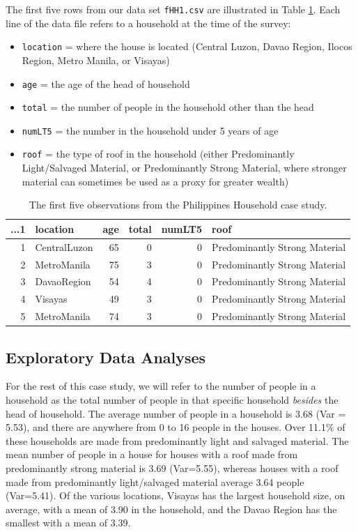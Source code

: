 \documentclass[
]{krantz}
\providecommand{\tightlist}{%
  \setlength{\itemsep}{0pt}\setlength{\parskip}{0pt}}
\begin{document}
The first five rows from our data set \texttt{fHH1.csv} are illustrated in Table \ref{tab:fHH1table1}. Each line of the data file refers to a household at the time of the survey:

\begin{itemize}
\tightlist
\item
  \texttt{location} = where the house is located (Central Luzon, Davao Region, Ilocos Region, Metro Manila, or Visayas)
\item
  \texttt{age} = the age of the head of household
\item
  \texttt{total} = the number of people in the household other than the head
\item
  \texttt{numLT5} = the number in the household under 5 years of age
\item
  \texttt{roof} = the type of roof in the household (either Predominantly Light/Salvaged Material, or Predominantly Strong Material, where stronger material can sometimes be used as a proxy for greater wealth)
\end{itemize}

\begin{table}

\caption{\label{tab:fHH1table1}The first five observations from the Philippines Household case study.}
\centering
\begin{tabular}[t]{rlrrrl}
\toprule
...1 & location & age & total & numLT5 & roof\\
\midrule
1 & CentralLuzon & 65 & 0 & 0 & Predominantly Strong Material\\
2 & MetroManila & 75 & 3 & 0 & Predominantly Strong Material\\
3 & DavaoRegion & 54 & 4 & 0 & Predominantly Strong Material\\
4 & Visayas & 49 & 3 & 0 & Predominantly Strong Material\\
5 & MetroManila & 74 & 3 & 0 & Predominantly Strong Material\\
\bottomrule
\end{tabular}
\end{table}

\subsection{Exploratory Data Analyses}\label{exploreHH}

For the rest of this case study, we will refer to the number of people in a household as the total number of people in that specific household \emph{besides} the head of household. The average number of people in a household is 3.68 (Var = 5.53), and there are anywhere from 0 to 16 people in the houses. Over 11.1\% of these households are made from predominantly light and salvaged material. The mean number of people in a house for houses with a roof made from predominantly strong material is 3.69 (Var=5.55), whereas houses with a roof made from predominantly light/salvaged material average 3.64 people (Var=5.41). Of the various locations, Visayas has the largest household size, on average, with a mean of 3.90 in the household, and the Davao Region has the smallest with a mean of 3.39.
\end{document}

